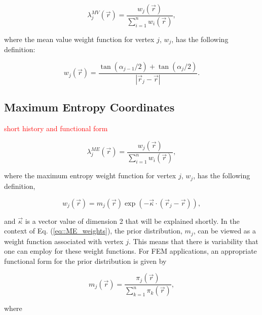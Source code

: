 \documentclass[preprint,10pt]{elsarticle}
\newcommand{\tcr}[1]{\textcolor{red}{#1}}
\begin{document}
\begin{equation}
\label{eq::MV_BF}
\lambda_{j}^{MV} (\vec{r}) = \frac{w_j (\vec{r}) }{\sum\limits_{i=1}^{n} w_i (\vec{r})} ,
\end{equation}

\noindent where the mean value weight function for vertex $j$, $w_j$, has the following definition:

\begin{equation}
\label{eq::MV_weights}
w_j (\vec{r})  = \frac{\tan(\alpha_{j-1} / 2) + \tan(\alpha_j / 2)}{|\vec{r}_j - \vec{r}|}.
\end{equation}

\subsection{Maximum Entropy Coordinates}

\tcr{short history and functional form}

\begin{equation}
\label{eq::ME_BF}
\lambda_{j}^{ME} (\vec{r}) = \frac{w_j (\vec{r}) }{\sum\limits_{i=1}^{n} w_i (\vec{r})} ,
\end{equation}

\noindent where the maximum entropy weight function for vertex $j$, $w_j$, has the following definition,

\begin{equation}
\label{eq::ME_weights}
w_j (\vec{r})  = m_j(\vec{r}) \exp(-  \vec{\kappa} \cdot (\vec{r}_j - \vec{r})),
\end{equation}

\noindent and $\vec{\kappa}$ is a vector value of dimension 2 that will be explained shortly. In the context of Eq. (\ref{eq::ME_weights}), the prior distribution, $m_j$, can be viewed as a weight function associated with vertex $j$. This means that there is variability that one can employ for these weight functions. For FEM applications, an appropriate functional form for the prior distribution is given by

\begin{equation}
\label{eq::ME_prior_funcs}
 m_j(\vec{r}) = \frac{\pi_j (\vec{r}) }{\sum\limits_{k=1}^{n} \pi_k (\vec{r})},
\end{equation}

\noindent where
\end{document}
